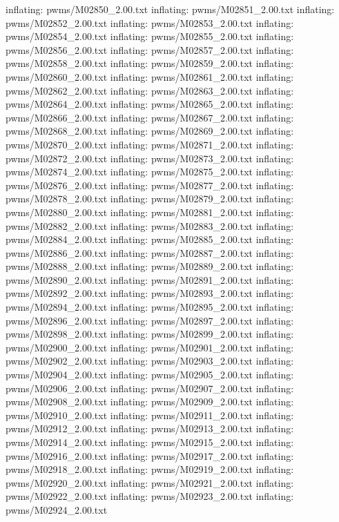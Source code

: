 \documentclass[letterpaper,10pt,english]{sphinxmanual}
\begin{document}
{\begin{sphinxVerbatim}[commandchars=\\\{\}]
  inflating: pwms/M02850\_2.00.txt
  inflating: pwms/M02851\_2.00.txt
  inflating: pwms/M02852\_2.00.txt
  inflating: pwms/M02853\_2.00.txt
  inflating: pwms/M02854\_2.00.txt
  inflating: pwms/M02855\_2.00.txt
  inflating: pwms/M02856\_2.00.txt
  inflating: pwms/M02857\_2.00.txt
  inflating: pwms/M02858\_2.00.txt
  inflating: pwms/M02859\_2.00.txt
  inflating: pwms/M02860\_2.00.txt
  inflating: pwms/M02861\_2.00.txt
  inflating: pwms/M02862\_2.00.txt
  inflating: pwms/M02863\_2.00.txt
  inflating: pwms/M02864\_2.00.txt
  inflating: pwms/M02865\_2.00.txt
  inflating: pwms/M02866\_2.00.txt
  inflating: pwms/M02867\_2.00.txt
  inflating: pwms/M02868\_2.00.txt
  inflating: pwms/M02869\_2.00.txt
  inflating: pwms/M02870\_2.00.txt
  inflating: pwms/M02871\_2.00.txt
  inflating: pwms/M02872\_2.00.txt
  inflating: pwms/M02873\_2.00.txt
  inflating: pwms/M02874\_2.00.txt
  inflating: pwms/M02875\_2.00.txt
  inflating: pwms/M02876\_2.00.txt
  inflating: pwms/M02877\_2.00.txt
  inflating: pwms/M02878\_2.00.txt
  inflating: pwms/M02879\_2.00.txt
  inflating: pwms/M02880\_2.00.txt
  inflating: pwms/M02881\_2.00.txt
  inflating: pwms/M02882\_2.00.txt
  inflating: pwms/M02883\_2.00.txt
  inflating: pwms/M02884\_2.00.txt
  inflating: pwms/M02885\_2.00.txt
  inflating: pwms/M02886\_2.00.txt
  inflating: pwms/M02887\_2.00.txt
  inflating: pwms/M02888\_2.00.txt
  inflating: pwms/M02889\_2.00.txt
  inflating: pwms/M02890\_2.00.txt
  inflating: pwms/M02891\_2.00.txt
  inflating: pwms/M02892\_2.00.txt
  inflating: pwms/M02893\_2.00.txt
  inflating: pwms/M02894\_2.00.txt
  inflating: pwms/M02895\_2.00.txt
  inflating: pwms/M02896\_2.00.txt
  inflating: pwms/M02897\_2.00.txt
  inflating: pwms/M02898\_2.00.txt
  inflating: pwms/M02899\_2.00.txt
  inflating: pwms/M02900\_2.00.txt
  inflating: pwms/M02901\_2.00.txt
  inflating: pwms/M02902\_2.00.txt
  inflating: pwms/M02903\_2.00.txt
  inflating: pwms/M02904\_2.00.txt
  inflating: pwms/M02905\_2.00.txt
  inflating: pwms/M02906\_2.00.txt
  inflating: pwms/M02907\_2.00.txt
  inflating: pwms/M02908\_2.00.txt
  inflating: pwms/M02909\_2.00.txt
  inflating: pwms/M02910\_2.00.txt
  inflating: pwms/M02911\_2.00.txt
  inflating: pwms/M02912\_2.00.txt
  inflating: pwms/M02913\_2.00.txt
  inflating: pwms/M02914\_2.00.txt
  inflating: pwms/M02915\_2.00.txt
  inflating: pwms/M02916\_2.00.txt
  inflating: pwms/M02917\_2.00.txt
  inflating: pwms/M02918\_2.00.txt
  inflating: pwms/M02919\_2.00.txt
  inflating: pwms/M02920\_2.00.txt
  inflating: pwms/M02921\_2.00.txt
  inflating: pwms/M02922\_2.00.txt
  inflating: pwms/M02923\_2.00.txt
  inflating: pwms/M02924\_2.00.txt

\end{sphinxVerbatim}}
\end{document}
